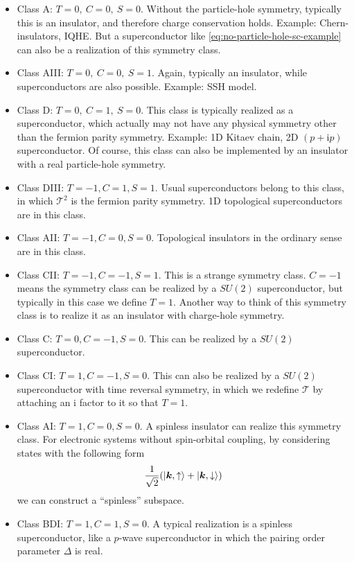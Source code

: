 \documentclass[hyperref, a4paper]{article}
\newcommand*{\ii}{\mathrm{i}}
\begin{document}
\begin{itemize}
    \item Class A: $T = 0, \  C = 0, \ S = 0$. Without the particle-hole symmetry,
    typically this is an insulator, and therefore charge conservation holds. Example: Chern-insulators, IQHE.
    But a superconductor like \eqref{eq:no-particle-hole-sc-example} can also be a realization of this symmetry class.
    \item Class AIII: $T = 0, \  C = 0, \ S = 1$. Again, typically an insulator, while superconductors are also possible. Example: SSH model. 
    \item Class D: $T = 0,\  C = 1, \ S = 0$. This class is typically realized as a superconductor,
    which actually may not have any physical symmetry other than the fermion parity symmetry.
    Example: 1D Kitaev chain, 2D $(p + \ii p)$ superconductor.
    Of course, this class can also be implemented by an insulator with a real particle-hole symmetry.
    \item Class DIII: $T=-1, C = 1, S = 1$. Usual superconductors belong to this class, in which 
    $\mathcal{T}^2$ is the fermion parity symmetry. 1D topological superconductors are in this class.
    \item Class AII: $T = -1, C = 0, S = 0$. 
    Topological insulators in the ordinary sense are in this class.
    \item Class CII: $T = -1, C = -1, S = 1$. This is a strange symmetry class. $C = -1$ means the 
    symmetry class can be realized by a $SU(2)$ superconductor, but typically in this case we define $T = 1$.
    Another way to think of this symmetry class is to realize it as an insulator with charge-hole symmetry.
    \item Class C: $T = 0, C = -1, S = 0$. This can be realized by a $SU(2)$ superconductor.
    \item Class CI: $T = 1, C = -1, S = 0$. This can also be realized by a $SU(2)$ superconductor with 
    time reversal symmetry, in which we redefine $\mathcal{T}$ by attaching an $\ii$ factor to it so that $T = 1$.
    \item Class AI: $T = 1, C = 0, S = 0$. A spinless insulator can realize this symmetry class. For electronic
    systems without spin-orbital coupling, by considering states with the following form 
    \[
        \frac{1}{\sqrt{2}}(\ket{\vb*{k}, \uparrow} + \ket{\vb*{k}, \downarrow})
    \]
    we can construct a ``spinless'' subspace.
    \item Class BDI: $T = 1, C = 1, S = 0$. A typical realization is a spinless superconductor, like a $p$-wave 
    superconductor in which the pairing order parameter $\Delta$ is real.
\end{itemize}
\end{document}
